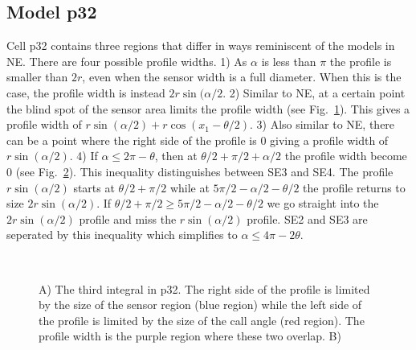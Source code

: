 \subsection{Model p32} \label{p32}

Cell p32 contains three regions that differ in ways reminiscent of the models in NE. There are four possible profile widths. 1) As $\alpha$ is less than $\pi$ the profile is smaller than $2r$, even when the sensor width is a full diameter. When this is the case, the profile width is instead $2r\sin(\alpha/2$. 2) Similar to NE, at a certain point the blind spot of the sensor area limits the profile width (see Fig.~\ref{f:p32AT}). This gives a profile width of $r\sin(\alpha/2) + r\cos(x_1 - \theta/2)$. 3) Also similar to NE, there can be a point where the right side of the profile is 0 giving a profile width of $r\sin(\alpha/2)$. 4) If $\alpha \le 2\pi - \theta$, then at $\theta/2 + \pi/2 + \alpha/2 $ the profile width become 0 (see Fig.~\ref{f:p32Last}). This inequality distinguishes between SE3 and SE4. The profile $r\sin(\alpha/2)$ starts at $\theta/2 + \pi/2$ while at $5\pi/2 - \alpha/2 - \theta/2$ the profile returns to size $2r\sin(\alpha/2)$. If $\theta/2 + \pi/2 \ge 5\pi/2 - \alpha/2 - \theta/2$ we go straight into the  $2r\sin(\alpha/2)$ profile and miss the $r\sin(\alpha/2)$ profile.  SE2 and SE3 are seperated by this inequality which simplifies to $\alpha \le 4\pi - 2\theta$. 



\begin{figure}[t]
        \centering
        \begin{subfigure}[t]{0.3\textwidth}
                \centering
                \caption{}
                \label{f:p32AT}
        \end{subfigure}
~ 
        \begin{subfigure}[t]{0.3\textwidth}
                \centering
                \caption{}
                \label{f:p32Last}
        \end{subfigure}
\caption{A) The third integral in p32. The right side of the profile is limited by the size of the sensor region (blue region) while the left side of the profile is limited by the size of the call angle (red region). The profile width is the purple region where these two overlap. B)     }
\label{f:p32}
\end{figure}

